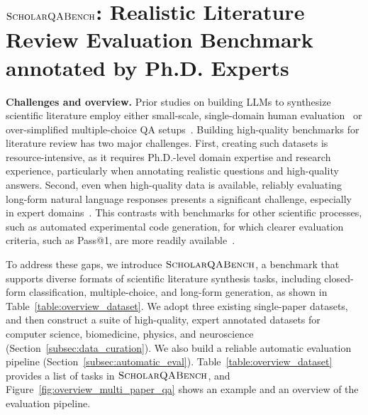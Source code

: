 \documentclass{article} %
\newcommand{\data}{$\textsc{ScholarQABench}$\xspace}
\renewcommand{\paragraph}[1]{\noindent \textbf{#1}}
\newcommand{\Tref}[1]{Table~\ref{#1}}
\begin{document}
\section{\data: Realistic Literature Review Evaluation Benchmark annotated by Ph.D. Experts}

\label{sec:dataset}
\paragraph{Challenges and overview.}
Prior studies on building LLMs to synthesize scientific literature employ either small-scale, single-domain human evaluation~\citep{agarwal2024litllm,zheng2024openresearcher} or over-simplified multiple-choice QA setups~\citep{skarlinski2024language}. 
Building high-quality benchmarks for literature review has two major challenges. First, creating such datasets is resource-intensive, as it requires Ph.D.-level domain expertise and research experience, particularly when annotating realistic questions and high-quality answers. Second, even when high-quality data is available, reliably evaluating long-form natural language responses presents a significant challenge, especially in expert domains~\citep{xu2023critical,xu-etal-2024-kiwi}. This contrasts with benchmarks for other scientific processes, such as automated experimental code generation, for which clearer evaluation criteria, such as Pass@1, are more readily available~\citep{si2024can}.

To address these gaps, we introduce \data, a  benchmark that supports diverse formats of scientific literature synthesis tasks, including closed-form classification, multiple-choice, and long-form generation, as shown in Table~\ref{table:overview_dataset}.
We adopt three existing single-paper datasets, and then construct a suite of high-quality, expert annotated datasets for computer science, biomedicine,  physics, and neuroscience (Section~\ref{subsec:data_curation}). We also build a reliable automatic evaluation pipeline (Section~\ref{subsec:automatic_eval}). 
\Tref{table:overview_dataset} provides a list of tasks in \data, and Figure~\ref{fig:overview_multi_paper_qa} shows an example and an overview of the evaluation pipeline. 
\end{document}
